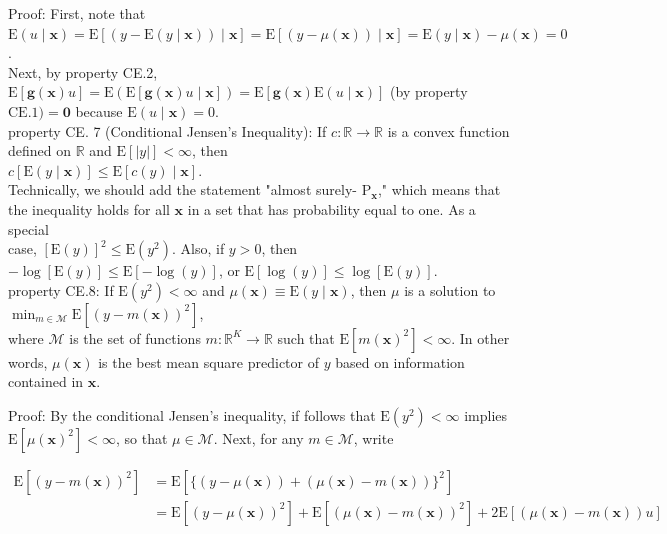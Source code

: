 \documentclass[10pt]{article}
\begin{document}
Proof: First, note that\\
$\mathrm{E}(u \mid \mathbf{x})=\mathrm{E}[(y-\mathrm{E}(y \mid \mathbf{x})) \mid \mathbf{x}]=\mathrm{E}[(y-\mu(\mathbf{x})) \mid \mathbf{x}]=\mathrm{E}(y \mid \mathbf{x})-\mu(\mathbf{x})=0$.\\
Next, by property CE.2, $\mathrm{E}[\mathbf{g}(\mathbf{x}) u]=\mathrm{E}(\mathrm{E}[\mathbf{g}(\mathbf{x}) u \mid \mathbf{x}])=\mathrm{E}[\mathbf{g}(\mathbf{x}) \mathrm{E}(u \mid \mathbf{x})]$ (by property $\mathrm{CE} .1)=\mathbf{0}$ because $\mathrm{E}(u \mid \mathbf{x})=0$.\\
property CE. 7 (Conditional Jensen's Inequality): If $c: \mathbb{R} \rightarrow \mathbb{R}$ is a convex function defined on $\mathbb{R}$ and $\mathrm{E}[|y|]<\infty$, then\\
$c[\mathrm{E}(y \mid \mathbf{x})] \leq \mathrm{E}[c(y) \mid \mathbf{x}]$.\\
Technically, we should add the statement "almost surely- $\mathrm{P}_{\mathbf{x}}$," which means that the inequality holds for all $\mathbf{x}$ in a set that has probability equal to one. As a special\\
case, $[\mathrm{E}(y)]^{2} \leq \mathrm{E}\left(y^{2}\right)$. Also, if $y>0$, then $-\log [\mathrm{E}(y)] \leq \mathrm{E}[-\log (y)]$, or $\mathrm{E}[\log (y)] \leq \log [\mathrm{E}(y)]$.\\
property CE.8: If $\mathrm{E}\left(y^{2}\right)<\infty$ and $\mu(\mathbf{x}) \equiv \mathrm{E}(y \mid \mathbf{x})$, then $\mu$ is a solution to $\min _{m \in \mathscr{M}} \mathrm{E}\left[(y-m(\mathbf{x}))^{2}\right]$,\\
where $\mathscr{M}$ is the set of functions $m: \mathbb{R}^{K} \rightarrow \mathbb{R}$ such that $\mathrm{E}\left[m(\mathbf{x})^{2}\right]<\infty$. In other words, $\mu(\mathbf{x})$ is the best mean square predictor of $y$ based on information contained in $\mathbf{x}$.

Proof: By the conditional Jensen's inequality, if follows that $\mathrm{E}\left(y^{2}\right)<\infty$ implies $\mathrm{E}\left[\mu(\mathbf{x})^{2}\right]<\infty$, so that $\mu \in \mathscr{M}$. Next, for any $m \in \mathscr{M}$, write

$$
\begin{aligned}
\mathrm{E}\left[(y-m(\mathbf{x}))^{2}\right] & =\mathrm{E}\left[\{(y-\mu(\mathbf{x}))+(\mu(\mathbf{x})-m(\mathbf{x}))\}^{2}\right] \\
& =\mathrm{E}\left[(y-\mu(\mathbf{x}))^{2}\right]+\mathrm{E}\left[(\mu(\mathbf{x})-m(\mathbf{x}))^{2}\right]+2 \mathrm{E}[(\mu(\mathbf{x})-m(\mathbf{x})) u]
\end{aligned}
$$
\end{document}
